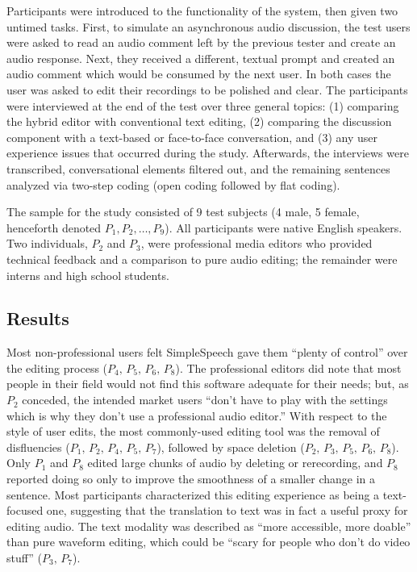\documentclass{sigchi}
\begin{document}
Participants were introduced to the functionality of the system, then given two untimed tasks. 
First, to simulate an asynchronous audio discussion, the test users were asked to read an audio comment left by the previous tester and create an audio response. 
Next, they received a different, textual prompt and created an audio comment which would be consumed by the next user. 
In both cases the user was asked to edit their recordings to be polished and clear.
The participants were interviewed at the end of the test over three general topics: (1) comparing the hybrid editor with conventional text editing, (2) comparing the discussion component with a text-based or face-to-face conversation, and (3) any user experience issues that occurred during the study. 
Afterwards, the interviews were transcribed, conversational elements filtered out, and the remaining sentences analyzed via two-step coding (open coding followed by flat coding). 

The sample for the study consisted of 9 test subjects (4 male, 5 female, henceforth denoted $P_1, P_2, \ldots, P_9$). 
All participants were native English speakers. 
Two individuals, $P_2$ and $P_3$, were professional media editors who provided technical feedback and a comparison to pure audio editing; the remainder were interns and high school students.

\subsection{Results}

Most non-professional users felt SimpleSpeech gave them ``plenty of control'' over the editing process ($P_4,\,P_5,\,P_6,\,P_8$). 
The professional editors did note that most people in their field would not find this software adequate for their needs; but, as $P_2$ conceded, the intended market users ``don't have to play with the settings which is why they don't use a professional audio editor.'' 
With respect to the style of user edits, the most commonly-used editing tool was the removal of disfluencies ($P_1,\,P_2,\,P_4,\,P_5,\,P_7$), followed by space deletion ($P_2,\,P_3,\,P_5,\,P_6,\,P_8$). 
Only $P_1$ and $P_8$ edited large chunks of audio by deleting or rerecording, and $P_8$ reported doing so only to improve the smoothness of a smaller change in a sentence.
Most participants characterized this editing experience as being a text-focused one, suggesting that the translation to text was in fact a useful proxy for editing audio. 
The text modality was described as ``more accessible, more doable'' than pure waveform editing, which could be ``scary for people who don't do video stuff'' ($P_3,\,P_7$).
\end{document}

